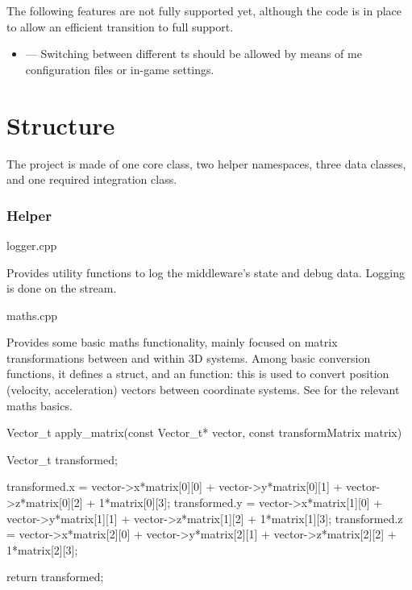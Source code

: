 The following \glspl{feature} are not fully supported yet, although the code is in place to allow an efficient transition to full support.

\begin{itemize}
	\item {} --- Switching between different \gls{ts} should be allowed by means of \gls{me} configuration files or in-game settings.
\end{itemize}

\section{Structure}\label{sc:middleware:structure}

The project is made of one core class, two helper namespaces, three data classes, and one required integration class.

\subsubsection{Helper}

\begin{filelist}
	logger.cpp
\end{filelist}

Provides utility functions to log the \gls{middleware}'s state and debug data. Logging is done on the  stream.

\begin{filelist}
	maths.cpp
\end{filelist}

Provides some basic maths functionality, mainly focused on matrix transformations between and within 3D systems. Among basic conversion functions, it defines a  struct, and an  function: this is used to convert position (velocity, acceleration) vectors between coordinate systems. See  for the relevant maths basics.

\begin{codelist}{1}
	Vector_t apply_matrix(const Vector_t* vector, const transformMatrix matrix) {
		Vector_t transformed;

		transformed.x = vector->x*matrix[0][0] + vector->y*matrix[0][1] +
						vector->z*matrix[0][2] + 1*matrix[0][3];
		transformed.y = vector->x*matrix[1][0] + vector->y*matrix[1][1] +
						vector->z*matrix[1][2] + 1*matrix[1][3];
		transformed.z = vector->x*matrix[2][0] + vector->y*matrix[2][1] +
						vector->z*matrix[2][2] + 1*matrix[2][3];

		return transformed;
	}
\end{codelist}

